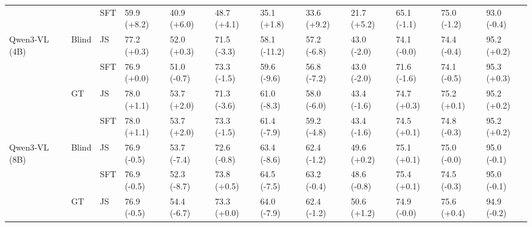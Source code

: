\begin{tabular}{llllllllllll}
 &  & SFT & 59.9 {\scriptsize(+8.2)} & 40.9 {\scriptsize(+6.0)} & 48.7 {\scriptsize(+4.1)} & 35.1 {\scriptsize(+1.8)} & 33.6 {\scriptsize(+9.2)} & 21.7 {\scriptsize(+5.2)} & 65.1 {\scriptsize(-1.1)} & 75.0 {\scriptsize(-1.2)} & 93.0 {\scriptsize(-0.4)} \\
\cline{1-12} \cline{2-12}
\multirow[t]{4}{*}{Qwen3‑VL (4B)} & \multirow[t]{2}{*}{Blind} & JS & 77.2 {\scriptsize(+0.3)} & 52.0 {\scriptsize(+0.3)} & 71.5 {\scriptsize(-3.3)} & 58.1 {\scriptsize(-11.2)} & 57.2 {\scriptsize(-6.8)} & 43.0 {\scriptsize(-2.0)} & 74.1 {\scriptsize(-0.0)} & 74.4 {\scriptsize(-0.4)} & 95.2 {\scriptsize(+0.2)} \\
 &  & SFT & 76.9 {\scriptsize(+0.0)} & 51.0 {\scriptsize(-0.7)} & 73.3 {\scriptsize(-1.5)} & 59.6 {\scriptsize(-9.6)} & 56.8 {\scriptsize(-7.2)} & 43.0 {\scriptsize(-2.0)} & 71.6 {\scriptsize(-1.6)} & 74.1 {\scriptsize(-0.5)} & 95.3 {\scriptsize(+0.3)} \\
\cline{2-12}
 & \multirow[t]{2}{*}{GT} & JS & 78.0 {\scriptsize(+1.1)} & 53.7 {\scriptsize(+2.0)} & 71.3 {\scriptsize(-3.6)} & 61.0 {\scriptsize(-8.3)} & 58.0 {\scriptsize(-6.0)} & 43.4 {\scriptsize(-1.6)} & 74.7 {\scriptsize(+0.3)} & 75.2 {\scriptsize(+0.1)} & 95.2 {\scriptsize(+0.2)} \\
 &  & SFT & 78.0 {\scriptsize(+1.1)} & 53.7 {\scriptsize(+2.0)} & 73.3 {\scriptsize(-1.5)} & 61.4 {\scriptsize(-7.9)} & 59.2 {\scriptsize(-4.8)} & 43.4 {\scriptsize(-1.6)} & 74.5 {\scriptsize(+0.1)} & 74.8 {\scriptsize(-0.3)} & 95.2 {\scriptsize(+0.2)} \\
\cline{1-12} \cline{2-12}
\multirow[t]{3}{*}{Qwen3‑VL (8B)} & \multirow[t]{2}{*}{Blind} & JS & 76.9 {\scriptsize(-0.5)} & 53.7 {\scriptsize(-7.4)} & 72.6 {\scriptsize(-0.8)} & 63.4 {\scriptsize(-8.6)} & 62.4 {\scriptsize(-1.2)} & 49.6 {\scriptsize(+0.2)} & 75.1 {\scriptsize(+0.1)} & 75.0 {\scriptsize(-0.0)} & 95.0 {\scriptsize(-0.1)} \\
 &  & SFT & 76.9 {\scriptsize(-0.5)} & 52.3 {\scriptsize(-8.7)} & 73.8 {\scriptsize(+0.5)} & 64.5 {\scriptsize(-7.5)} & 63.2 {\scriptsize(-0.4)} & 48.6 {\scriptsize(-0.8)} & 75.4 {\scriptsize(+0.1)} & 74.5 {\scriptsize(-0.3)} & 95.0 {\scriptsize(-0.1)} \\
\cline{2-12}
 & GT & JS & 76.9 {\scriptsize(-0.5)} & 54.4 {\scriptsize(-6.7)} & 73.3 {\scriptsize(+0.0)} & 64.0 {\scriptsize(-7.9)} & 62.4 {\scriptsize(-1.2)} & 50.6 {\scriptsize(+1.2)} & 74.9 {\scriptsize(-0.0)} & 75.6 {\scriptsize(+0.4)} & 94.9 {\scriptsize(-0.2)} \\
\cline{1-12} \cline{2-12}
\bottomrule
\end{tabular}
